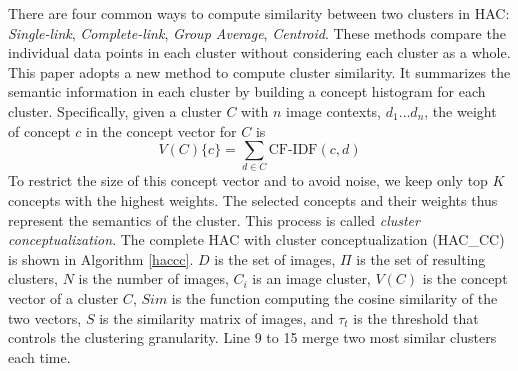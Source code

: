 There are four common ways to compute similarity between two clusters in
HAC:
\emph{Single-link}, \emph{Complete-link},
\emph{Group Average}, \emph{Centroid}.
These methods compare the individual data points in each
cluster without considering each cluster as a whole.
This paper adopts a new method to compute cluster similarity.
It summarizes the semantic information in each cluster by
building a concept histogram for each cluster.
Specifically, given a cluster $C$ with $n$ image contexts,
$d_1 \ldots d_n$,
the weight of concept $c$ in the concept vector for $C$ is
\begin{equation}
\label{comv}
V(C)\{c\}=\sum_{d\in C}{\mbox{CF-IDF}(c, d)}
\end{equation}
%
%
To restrict the size of this concept vector and to avoid noise,
we keep only top $K$ concepts with the highest weights.
The selected concepts and their weights thus represent
the semantics of the cluster.
This process is called {\em cluster conceptualization}.
The complete HAC with cluster conceptualization (HAC\_CC) is shown
in Algorithm \ref{haccc}. $D$ is the set of images, $\Pi$ is the set of resulting clusters,
$N$ is the number of images, $C_i$ is an image
cluster, $V(C)$ is the concept vector of a cluster $C$,
$Sim$ is the function computing the cosine similarity of the two vectors,
$S$ is the similarity matrix of images,
and $\tau_t$ is the threshold that controls the clustering granularity.
Line 9 to 15 merge two most similar clusters each time.

